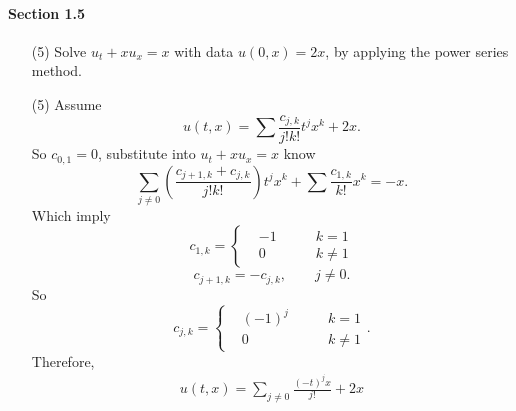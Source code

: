 \paragraph*{Section 1.5}
\begin{itemize}
    \item [(5)] Solve $u_t + xu_x = x$ with data $u(0, x) = 2x$,
    by applying the power series method.
\end{itemize}

\begin{solution}
    \begin{itemize}
        \item [(5)] Assume 
        \[u(t, x) = \sum \frac{c_{j,k}}{j! k!} t^j x^k + 2x.\]
        So $c_{0, 1} = 0$, substitute into $u_t + xu_x = x$ know 
\[\sum_{j \neq 0} (\frac{c_{j + 1, k} + c_{j, k}}{j! k!}) t^j x^k + \sum\frac{c_{1, k}}{ k!} x^k =
-x.\]
        Which imply 
        \[ c_{1, k} = \left\{ \begin{aligned}
            &-1 \qquad & k = 1\\
            &0  \qquad & k \neq 1
        \end{aligned}  \right.\]
        \[c_{j + 1,k} = -c_{j, k}, \qquad j \neq 0.\]
        So 
        \[c_{j, k} = \left\{
            \begin{aligned}
                &(-1)^j  \qquad & k = 1 \\
                &0                       & k \neq 1
            \end{aligned}
        \right..\]
        Therefore,
            \begin{align*}
                u(t, x) = \sum_{j \neq 0} \frac{(-t)^j x}{j!} + 2x 
            \end{align*}

    \end{itemize}
\end{solution}